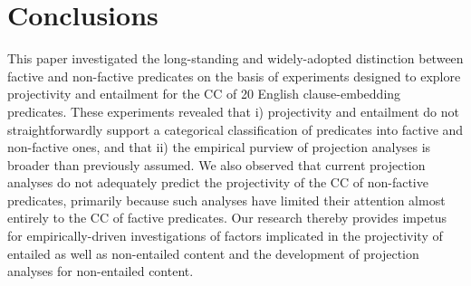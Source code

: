 \documentclass[11pt,fleqn]{article}
\newcommand{\6}{\mbox{$[\hspace*{-.6mm}[$}}
\newcommand{\9}{\mbox{$]\hspace*{-.6mm}]$}}
\begin{document}
{\begin{itemize}
\end{itemize}

\section{Conclusions}\label{s5}

This paper investigated the long-standing and widely-adopted distinction between factive and non-factive predicates on the basis of experiments designed to explore projectivity and entailment for the CC of 20 English clause-embedding predicates. These experiments revealed that i) projectivity and entailment do not straightforwardly support a categorical classification of predicates into factive and non-factive ones, and that ii) the empirical purview of projection analyses is broader than previously assumed. We also observed that current projection analyses do not adequately predict the projectivity of the CC of non-factive predicates, primarily because such analyses have limited their attention almost entirely to the CC of factive predicates. Our research thereby provides impetus for empirically-driven investigations of factors implicated in the projectivity of entailed as well as non-entailed content and the development of projection analyses for non-entailed content.


%
%

}
\end{document}
